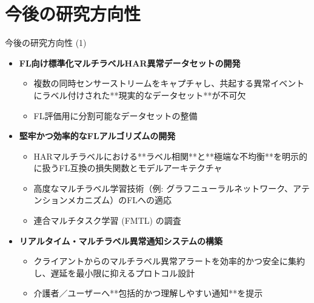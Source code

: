 \documentclass[unicode,12pt,aspectratio=169,dvipdfmx]{beamer}
\begin{document}
\section{今後の研究方向性}
\begin{frame}{今後の研究方向性 (1)}
\begin{itemize}
    \item \textbf{FL向け標準化マルチラベルHAR異常データセットの開発}
    \begin{itemize}
        \item 複数の同時センサーストリームをキャプチャし、共起する異常イベントにラベル付けされた**現実的なデータセット**が不可欠
        \item FL評価用に分割可能なデータセットの整備
    \end{itemize}
    \item \textbf{堅牢かつ効率的なFLアルゴリズムの開発}
    \begin{itemize}
        \item HARマルチラベルにおける**ラベル相関**と**極端な不均衡**を明示的に扱うFL互換の損失関数とモデルアーキテクチャ
        \item 高度なマルチラベル学習技術（例: グラフニューラルネットワーク、アテンションメカニズム）のFLへの適応
        \item 連合マルチタスク学習 (FMTL) の調査
    \end{itemize}
    \item \textbf{リアルタイム・マルチラベル異常通知システムの構築}
    \begin{itemize}
        \item クライアントからのマルチラベル異常アラートを効率的かつ安全に集約し、遅延を最小限に抑えるプロトコル設計
        \item 介護者／ユーザーへ**包括的かつ理解しやすい通知**を提示
    \end{itemize}
\end{itemize}
\end{frame}
\end{document}

